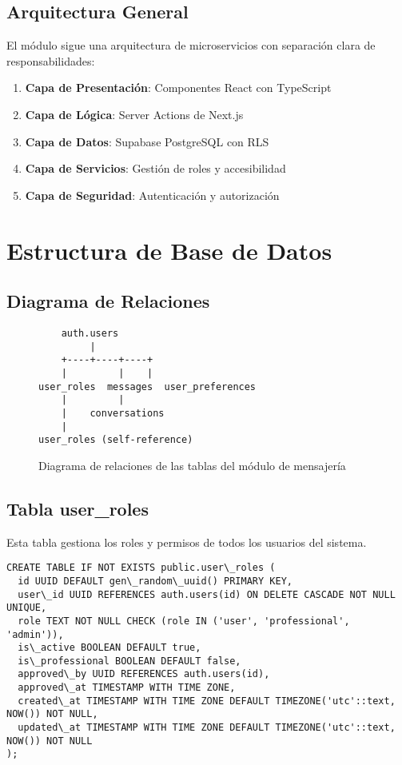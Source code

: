 \documentclass[12pt,a4paper]{article}
\begin{document}
\subsection{Arquitectura General}

El módulo sigue una arquitectura de microservicios con separación clara de responsabilidades:

\begin{enumerate}
    \item \textbf{Capa de Presentación}: Componentes React con TypeScript
    \item \textbf{Capa de Lógica}: Server Actions de Next.js
    \item \textbf{Capa de Datos}: Supabase PostgreSQL con RLS
    \item \textbf{Capa de Servicios}: Gestión de roles y accesibilidad
    \item \textbf{Capa de Seguridad}: Autenticación y autorización
\end{enumerate}

\section{Estructura de Base de Datos}

\subsection{Diagrama de Relaciones}

\begin{figure}[h]
\centering
\begin{verbatim}
    auth.users
         |
    +----+----+----+
    |         |    |
user_roles  messages  user_preferences
    |         |
    |    conversations
    |
user_roles (self-reference)
\end{verbatim}
\caption{Diagrama de relaciones de las tablas del módulo de mensajería}
\end{figure}

\subsection{Tabla user\_roles}

Esta tabla gestiona los roles y permisos de todos los usuarios del sistema.

\begin{lstlisting}[caption=Estructura completa de user\_roles]
CREATE TABLE IF NOT EXISTS public.user\_roles (
  id UUID DEFAULT gen\_random\_uuid() PRIMARY KEY,
  user\_id UUID REFERENCES auth.users(id) ON DELETE CASCADE NOT NULL UNIQUE,
  role TEXT NOT NULL CHECK (role IN ('user', 'professional', 'admin')),
  is\_active BOOLEAN DEFAULT true,
  is\_professional BOOLEAN DEFAULT false,
  approved\_by UUID REFERENCES auth.users(id),
  approved\_at TIMESTAMP WITH TIME ZONE,
  created\_at TIMESTAMP WITH TIME ZONE DEFAULT TIMEZONE('utc'::text, NOW()) NOT NULL,
  updated\_at TIMESTAMP WITH TIME ZONE DEFAULT TIMEZONE('utc'::text, NOW()) NOT NULL
);
\end{lstlisting}
\end{document}
